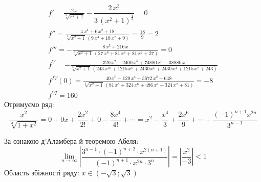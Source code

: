 \documentclass[../rgr_2.tex]{subfiles}
\begin{document}


\Solution

\begin{align}
	f' = \frac{2\,x}{\sqrt[{3}]{{x}^{2}+1}}-\dfrac{2\,{x}^{3}}{3\,\left({{x}^{2}+1}\right)^{\frac{4}{3}}} = 0 \\
	f'' =
		\frac{4\,{x}^{4}+6\,{x}^{2}+18}{\sqrt[{3}]{{x}^{2}+1}\,\left(9\,{x}^{4}+18\,{x}^{2}+9\right)} = \frac{18}{9} = 2
		\\
	f''' = -\frac{8\,{x}^{5}+216\,x}{\sqrt[{3}]{{x}^{2}+1}\,\left(27\,{x}^{6}+81\,{x}^{4}+81\,{x}^{2}+27\right)} = 0
		\\
	f^V =
		-\frac{320\,{x}^{7}-2400\,{x}^{5}+74880\,{x}^{3}-38880\,x}{\sqrt[{3}]{{x}^{2}+1}\,\left(243\,{x}^{10}+1215\,{x}^{8}+2430\,{x}^{6}+2430\,{x}^{4}+1215\,{x}^{2}+243\right)}
		\\
	f^{IV}(0) =
	\frac{40\,{x}^{6}-120\,{x}^{4}+3672\,{x}^{2}-648}{\sqrt[{3}]{{x}^{2}+1}\,\left(81\,{x}^{8}+324\,{x}^{6}+486\,{x}^{4}+324\,{x}^{2}+81\right)}
	= -8 \\
	f^{VI} =
		160
\end{align}
Отримуємо ряд:
\begin{equation}
	\frac{x^2}{\sqrt[3]{1+x^2}}
	= 0+0x+\frac{2x^2}{2!}+0-\frac{8x^4}{4!} + \cdots
	= x^2-\frac{x^4}{3} %
		+ \frac{2x^6}{9}
		+ \cdots
		+ \frac{(-1)^{n+1}x^{2n}}{3^{n-1}}
\end{equation}

За ознакою д'Аламбера й теоремою Абеля:
\begin{equation}
	\lim_{n\to\infty}
	\left|
		\frac{3^{n-1} \cdot (-1)^{n+2} \cdot x^{2(n+1)}}
		{(-1)^{n+1}\cdot x^{2n}\cdot 3^n}
	\right|
	=
	\left|
		\frac{x^2}{-3}
	\right| < 1
\end{equation}
Область збіжності ряду: $x\in (-\sqrt3;\sqrt3)$


\end{document}
